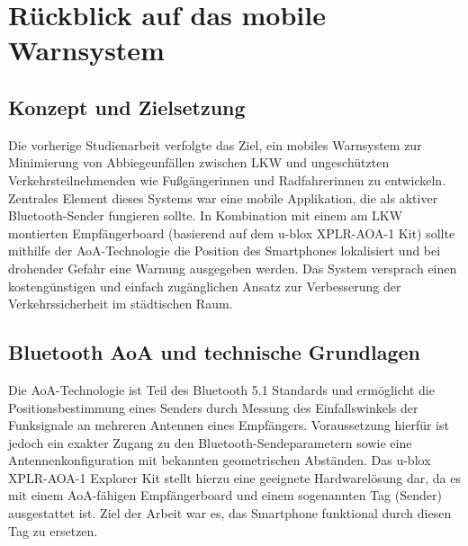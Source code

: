 \documentclass[a4paper, 12pt]{article} %
\begin{document}
\clearpage

\section{Rückblick auf das mobile Warnsystem}
\subsection{Konzept und Zielsetzung}
Die vorherige Studienarbeit verfolgte das Ziel, ein mobiles Warnsystem zur Minimierung von 
Abbiegeunfällen zwischen \ac{LKW} und ungeschützten Verkehrsteilnehmenden wie Fußgängerinnen und Radfahrerinnen zu entwickeln.
Zentrales Element dieses Systems war eine mobile Applikation, die als aktiver Bluetooth-Sender fungieren sollte. In Kombination 
mit einem am \ac{LKW} montierten Empfängerboard (basierend auf dem u-blox XPLR-AOA-1 Kit) sollte mithilfe der \acf{AoA}-Technologie 
die Position des Smartphones lokalisiert und bei drohender Gefahr eine Warnung ausgegeben werden. Das System versprach einen 
kostengünstigen und einfach zugänglichen Ansatz zur Verbesserung der Verkehrssicherheit im städtischen Raum.

\subsection{Bluetooth AoA und technische Grundlagen}
Die \ac{AoA}-Technologie ist Teil des Bluetooth 5.1 Standards und ermöglicht die Positionsbestimmung
 eines Senders durch Messung des Einfallswinkels der Funksignale an mehreren Antennen eines Empfängers. 
 Voraussetzung hierfür ist jedoch ein exakter Zugang zu den Bluetooth-Sendeparametern sowie eine Antennenkonfiguration 
 mit bekannten geometrischen Abständen. Das u-blox XPLR-AOA-1 Explorer Kit stellt hierzu eine geeignete Hardwarelösung dar, 
 da es mit einem \ac{AoA}-fähigen Empfängerboard und einem sogenannten Tag (Sender) ausgestattet ist. Ziel der Arbeit war es, das Smartphone 
 funktional durch diesen Tag zu ersetzen.
\end{document}
